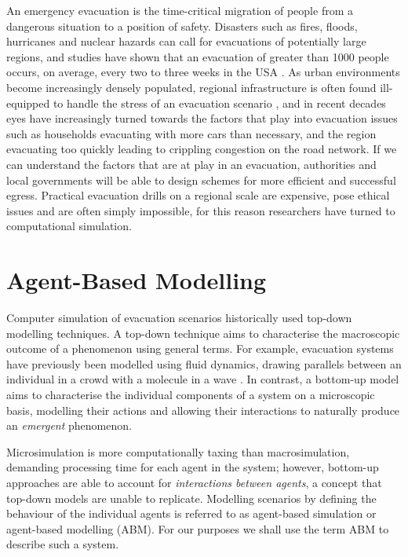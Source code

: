 An emergency evacuation is the time-critical migration of people from a dangerous situation to a position of safety. Disasters such as fires, floods, hurricanes and nuclear hazards can call for evacuations of potentially large regions, and studies have shown that an evacuation of greater than 1000 people occurs, on average, every two to three weeks in the USA \cite{SandiaNationalLaboratories2005IdentificationEvacuations,Murray-Tuite2013EvacuationPractice}. As urban environments become increasingly densely populated, regional infrastructure is often found ill-equipped to handle the stress of an evacuation scenario \cite{Pitt2008TheFloods}, and in recent decades eyes have increasingly turned towards the factors that play into evacuation issues \cite{Dow2002EmergingCarolina} such as households evacuating with more cars than necessary, and the region evacuating too quickly leading to crippling congestion on the road network. If we can understand the factors that are at play in an evacuation, authorities and local governments will be able to design schemes for more efficient and successful egress. Practical evacuation drills on a regional scale are expensive, pose ethical issues and are often simply impossible, for this reason researchers have turned to computational simulation. 

\section{Agent-Based Modelling}
Computer simulation of evacuation scenarios historically used top-down modelling techniques. A top-down technique aims to characterise the macroscopic outcome of a phenomenon using general terms. For example, evacuation systems have previously been modelled using fluid dynamics, drawing parallels between an individual in a crowd with a molecule in a wave \cite{Thompson1995APopulations}.
In contrast, a bottom-up model aims to characterise the individual components of a system on a microscopic basis, modelling their actions and allowing their interactions to naturally produce an \textit{emergent} phenomenon. 

Microsimulation is more computationally taxing than macrosimulation, demanding processing time for each agent in the system; however, bottom-up approaches are able to account for \textit{interactions between agents}, a concept that top-down models are unable to replicate. Modelling scenarios by defining the behaviour of the individual agents is referred to as agent-based simulation or agent-based modelling (ABM). For our purposes we shall use the term ABM to describe such a system.

